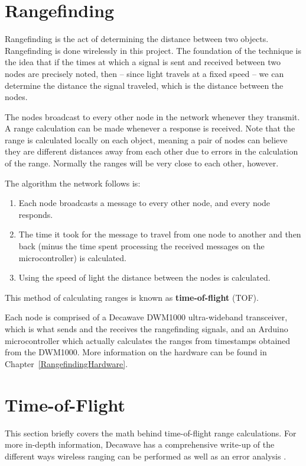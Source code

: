 \section{Rangefinding}
Rangefinding is the act of determining the distance between two objects. Rangefinding is done wirelessly in this project. The foundation of the technique is the idea that if the times at which a signal is sent and received between two nodes are precisely noted, then -- since light travels at a fixed speed -- we can determine the distance the signal traveled, which is the distance between the nodes. 

The nodes broadcast to every other node in the network whenever they transmit. A range calculation can be made whenever a response is received. Note that the range is calculated locally on each object, meaning a pair of nodes can believe they are different distances away from each other due to errors in the calculation of the range. Normally the ranges will be very close to each other, however.

The algorithm the network follows is: 
\begin{enumerate}
	\item Each node broadcasts a message to every other node, and every node responds. 
	\item The time it took for the message to travel from one node to another and then back (minus the time spent processing the received messages on the microcontroller) is calculated.
	\item Using the speed of light the distance between the nodes is calculated. 
\end{enumerate}

This method of calculating ranges is known as \textbf{time-of-flight} (TOF).

Each node is comprised of a Decawave DWM1000 ultra-wideband transceiver, which is what sends and the receives the rangefinding signals, and an Arduino microcontroller which actually calculates the ranges from timestamps obtained from the DWM1000. More information on the hardware can be found in Chapter~\ref{RangefindingHardware}.

\section{Time-of-Flight}
This section briefly covers the math behind time-of-flight range calculations. For more in-depth information, Decawave has a comprehensive write-up of the different ways wireless ranging can be performed as well as an error analysis \cite{DW1000UserManual}.

